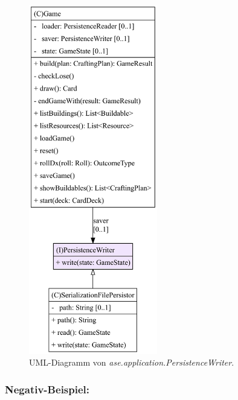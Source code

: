 \begin{figure}[H]
	\centering
	\includegraphics[width=0.5\textwidth]{Bilder/PersistenceWriter_structure.pdf} 
	\caption{UML-Diagramm von \textit{ase.application.PersistenceWriter}.}
	\label{fig:coupling-PersistenceWriter}
\end{figure} 

\subsubsection{Negativ-Beispiel:}

